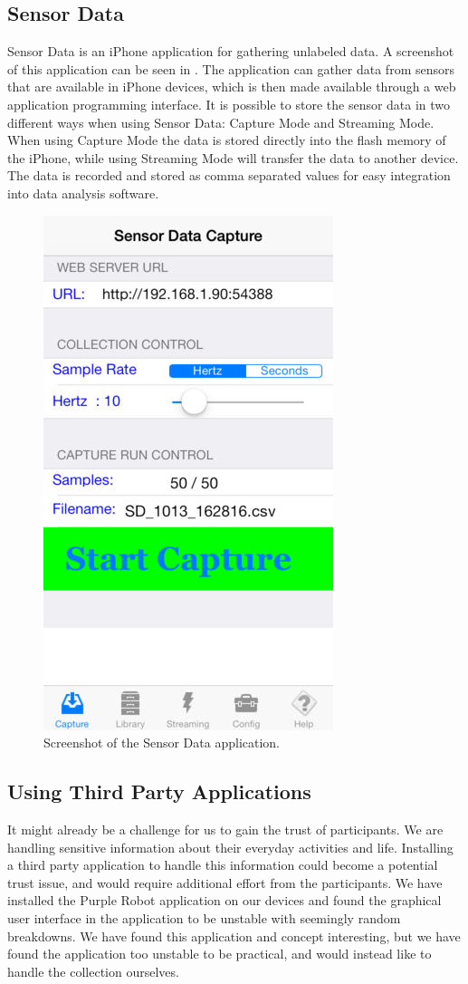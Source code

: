 \subsection{Sensor Data}
\label{sub:sensor_data}
Sensor Data is an iPhone application for gathering unlabeled data. A screenshot of this application can be seen in . The application can gather data from sensors that are available in iPhone devices, which is then made available through a web application programming interface. It is possible to store the sensor data in two different ways when using Sensor Data: Capture Mode and Streaming Mode. When using Capture Mode the data is stored directly into the flash memory of the iPhone, while using Streaming Mode will transfer the data to another device. The data is recorded and stored as comma separated values for easy integration into data analysis software.

\begin{figure}[!htbp]
	\centering
	\includegraphics[height=0.5\textwidth]{graphic/existing_solutions/sensor_data}
	\caption[]{Screenshot of the Sensor Data application\parencite{sensor_data_app_itunes}.}
	\label{fig:sensor_data_screenshot}
\end{figure}
\FloatBarrier

\subsection{Using Third Party Applications}
It might already be a challenge for us to gain the trust of participants. We are handling sensitive information about their everyday activities and life. Installing a third party application to handle this information could become a potential trust issue, and would require additional effort from the participants. We have installed the Purple Robot application on our devices and found the graphical user interface in the application to be unstable with seemingly random breakdowns. We have found this application and concept interesting, but we have found the application too unstable to be practical, and would instead like to handle the collection ourselves. 